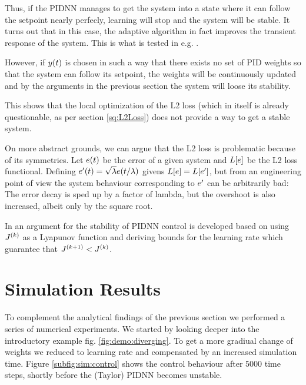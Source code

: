 \documentclass{article}
\begin{document}
    Thus, if the PIDNN manages to get the system into a state where it can follow the setpoint nearly perfecly, 
    learning will stop and the system will be stable. 
    It turns out that in this case, the adaptive algorithm in fact improves the transient response of the system. This
    is what is tested in e.g. \cite{yu_applying_2006}.

    However, if $y(t)$ is chosen in such a way that there exists no set of PID weights so that the system can 
    follow its setpoint, the weights will be continuously updated and by the arguments in the previous section the 
    system will loose its stability.

    This shows that the local optimization of the L2 loss (which in itself is already questionable, as per 
    section \ref{sq:L2Loss}) does not provide a way to get a stable system.

    On more abstract grounds, we can argue that the L2 loss is problematic because of its symmetries. Let $e(t)$ be
    the error of a given system and $L[e]$ be the L2 loss functional. Defining 
    $e^\prime(t) = \sqrt{\lambda} e(t/\lambda)$ givens $L[e] = L[e^\prime]$, but from an 
    engineering point of view the system behaviour corresponding to $e^\prime$ can be arbitrarily bad: The error
    decay is sped up by a factor of lambda, but the overshoot is also increased, albeit only by the square root. 

    In \cite{cong_novel_2005} an argument for the stability of PIDNN control is
    developed based on using ${J}^{(k)}$ as a Lyapunov function and deriving 
    bounds for the learning rate which guarantee that 
    ${J}^{(k+1)} < {J}^{(k)}$.












  \section{Simulation Results}
    To complement the analytical findings of the previous section we performed a series of numerical experiments. 
    We started by looking deeper into the introductory example fig. \ref{fig:demo:diverging}. To get a more gradiual 
    change of weights we reduced to learning rate and compensated by an increased simulation time. Figure 
    \ref{subfig:sim:control} shows the control behaviour after 5000 time steps, shortly before the (Taylor) PIDNN becomes
    unstable. 
\end{document}
